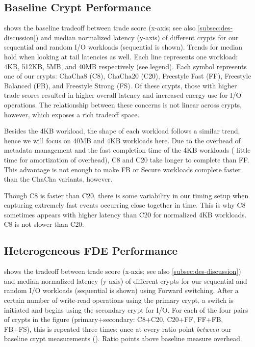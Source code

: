 \subsection{Baseline Crypt Performance}\label{subsec:eval-baseline}



 shows the baseline tradeoff between trade score
(x-axis; see also \cref{subsec:des-discussion}) and median normalized latency
(y-axis) of different crypts for our sequential and random I/O workloads
(sequential is shown). Trends for median hold when looking at tail latencies as
well. Each line represents one workload: 4KB, 512KB, 5MB, and 40MB respectively
(see legend). Each symbol represents one of our crypts: ChaCha8 (C8), ChaCha20
(C20), Freestyle Fast (FF), Freestyle Balanced (FB), and Freestyle Strong (FS).
Of these crypts, those with higher trade scores resulted in higher overall
latency and increased energy use for I/O operations. The relationship between
these concerns is not linear across crypts, however, which exposes a rich
tradeoff space.

Besides the 4KB workload, the shape of each workload follows a similar trend,
hence we will focus on 40MB and 4KB workloads here. Due to the overhead of
metadata management and the fast completion time of the 4KB workloads (\ie
little time for amortization of overhead), C8 and C20 take longer to complete
than FF. This advantage is not enough to make FB or Secure workloads complete
faster than the ChaCha variants, however.

Though C8 is faster than C20, there is some variability in our timing setup when
capturing extremely fast events occurring close together in time. This is why C8
sometimes appears with higher latency than C20 for normalized 4KB workloads. C8
is not slower than C20.


\subsection{Heterogeneous FDE Performance}\label{subsec:eval-flexible}



 shows the tradeoff between trade score (x-axis; see also
\cref{subsec:des-discussion}) and median normalized latency (y-axis) of
different crypts for our sequential and random I/O workloads (sequential is
shown) using Forward switching. After a certain number of write-read operations
using the primary crypt, a switch is initiated and \sys begins using the
secondary crypt for I/O. For each of the four pairs of crypts in the figure
(primary+secondary: C8+C20, C20+FF, FF+FB, FB+FS), this is repeated three times:
once at every ratio point {\em between} our baseline crypt measurements
(). Ratio points above baseline measure
overhead.

